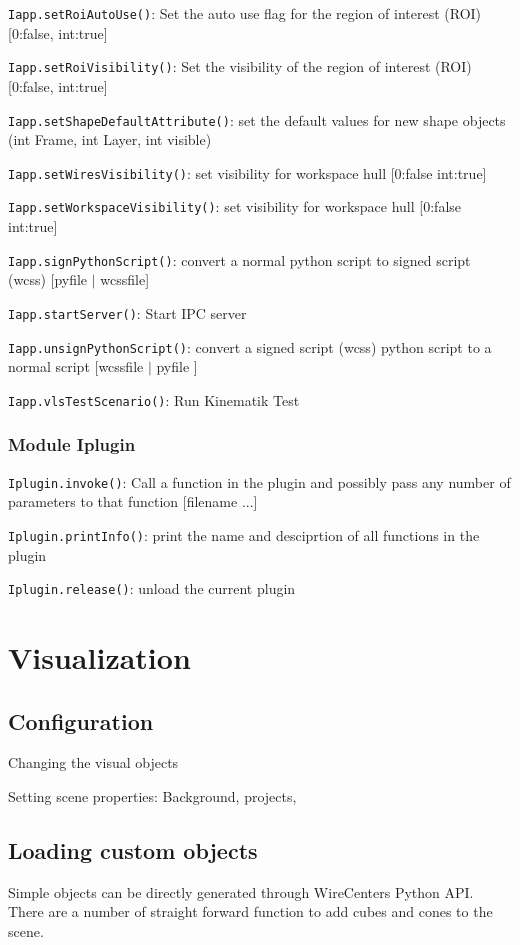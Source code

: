 \documentclass[11pt,a4paper,onepage,openany]{book}
\begin{document}
\texttt{Iapp.setRoiAutoUse()}: Set the auto use flag for the region of interest
(ROI) [0:false, int:true]

\texttt{Iapp.setRoiVisibility()}: Set the visibility of the region of interest
(ROI) [0:false, int:true]

\texttt{Iapp.setShapeDefaultAttribute()}: set the default values for new shape
objects (int Frame, int Layer, int visible)

\texttt{Iapp.setWiresVisibility()}: set visibility for workspace hull [0:false
int:true]

\texttt{Iapp.setWorkspaceVisibility()}: set visibility for workspace hull
[0:false int:true]

\texttt{Iapp.signPythonScript()}: convert a normal python script to signed
script (wcss) [pyfile $|$ wcssfile]

\texttt{Iapp.startServer()}: Start IPC server

\texttt{Iapp.unsignPythonScript()}: convert a signed script (wcss) python
script to a normal script [wcssfile $|$ pyfile ]

\texttt{Iapp.vlsTestScenario()}: Run Kinematik Test

\subsection{Module Iplugin }
\texttt{Iplugin.invoke()}: Call a function in the plugin and possibly pass any
number of parameters to that function [filename ...]

\texttt{Iplugin.printInfo()}: print the name and desciprtion of all functions
in the plugin

\texttt{Iplugin.release()}: unload the current plugin

\chapter{Visualization}

\section{Configuration}
Changing the visual objects

Setting scene properties: Background, projects,

\section{Loading custom objects}
Simple objects can be directly generated through WireCenters Python API.
There are a number of straight forward function to add cubes and cones to the
scene.
\end{document}
